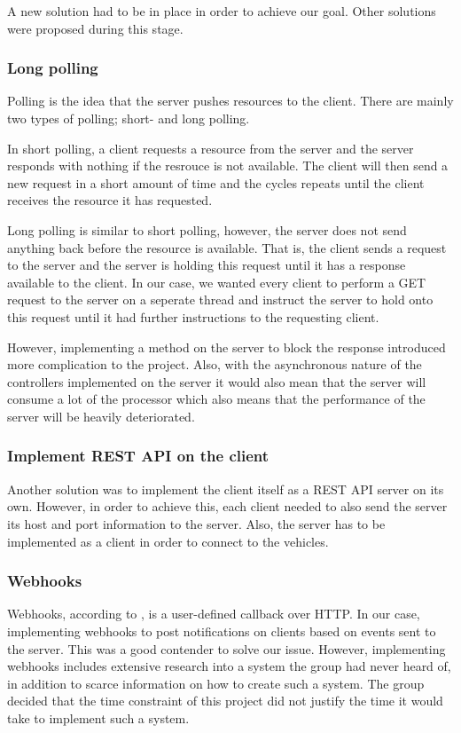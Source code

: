 A new solution had to be in place in order to achieve our goal. Other solutions were proposed during this stage.

\subsubsection*{Long polling}
Polling is the idea that the server pushes resources to the client. There are mainly two types of polling; short- and long polling. 

In short polling, a client requests a resource from the server and the server responds with nothing if the resrouce is not available. The client will then send a new request in a short amount of time and the cycles repeats until the client receives the resource it has requested.

Long polling is similar to short polling, however, the server does not send anything back before the resource is available. That is, the client sends a request to the server and the server is holding this request until it has a response available to the client. In our case, we wanted every client to perform a GET request to the server on a seperate thread and instruct the server to hold onto this request until it had further instructions to the requesting client.

However, implementing a method on the server to block the response introduced more complication to the project. Also, with the asynchronous nature of the controllers implemented on the server it would also mean that the server will consume a lot of the processor which also means that the performance of the server will be heavily deteriorated.

\subsubsection*{Implement REST API on the client}
Another solution was to implement the client itself as a REST API server on its own. However, in order to achieve this, each client needed to also send the server its host and port information to the server. Also, the server has to be implemented as a client in order to connect to the vehicles.

\subsubsection{Webhooks}
Webhooks, according to \cite{webhooks}, is a user-defined callback over HTTP. In our case, implementing webhooks to post notifications on clients based on events sent to the server. This was a good contender to solve our issue. However, implementing webhooks includes extensive research into a system the group had never heard of, in addition to scarce information on how to create such a system. The group decided that the time constraint of this project did not justify the time it would take to implement such a system.
